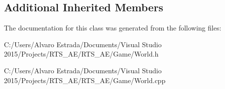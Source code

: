 \subsection*{Additional Inherited Members}


The documentation for this class was generated from the following files\+:\begin{DoxyCompactItemize}
\item 
C\+:/\+Users/\+Alvaro Estrada/\+Documents/\+Visual Studio 2015/\+Projects/\+R\+T\+S\+\_\+\+A\+E/\+R\+T\+S\+\_\+\+A\+E/\+Game/World.\+h\item 
C\+:/\+Users/\+Alvaro Estrada/\+Documents/\+Visual Studio 2015/\+Projects/\+R\+T\+S\+\_\+\+A\+E/\+R\+T\+S\+\_\+\+A\+E/\+Game/World.\+cpp\end{DoxyCompactItemize}

